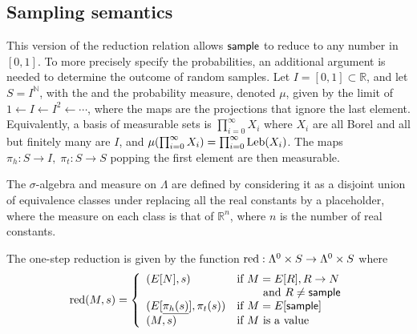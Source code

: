 \subsection{Sampling semantics}
\label{sec:sampling semantics}
This version of the reduction relation allows $\mathsf{sample}$ to reduce to any number in $[0,1]$. To more precisely specify the probabilities, an additional argument is needed to determine the outcome of random samples. Let $ I = [0,1] \subset \mathbb{R} $, and let $S = I^{\mathbb{N}}$, with the  and the probability measure, denoted $\mu$, given by the limit of $1 \gets I \gets I^2 \gets \cdots$, where the maps are the projections that ignore the last element. Equivalently, a basis of measurable sets is $\prod_{i=0}^\infty X_i$ where $X_i$ are all Borel and all but finitely many are $I$, and $\mu (\prod_{i=0}^\infty X_i) = \prod_{i=0}^\infty \mathrm{Leb}(X_i)$.
The maps $\pi_h:S \to I, \; \pi_t:S \to S$ popping the first element are then measurable.

The $\sigma$-algebra and measure on $\Lambda$ are defined by considering it as a disjoint union of equivalence classes under replacing all the real constants by a placeholder, where the measure on each class is that of $\mathbb{R}^n$, where $n$ is the number of real constants.

The one-step reduction is given by the function $\operatorname{red} : \Lambda^0 \times S \to \Lambda^0 \times S$ where
\begin{equation*}
\operatorname{red}(M,s) = \left\{
    \begin{array}{ll}
        (E[N],s) & \text{if } M = E[R], R \to N\\
        & \qquad \text{ and } R \neq \mathsf{sample} \\
        (E[\underline{\pi_h(s)}],\pi_t(s)) & \text{if } M = E[\mathsf{sample}] \\
        (M,s) & \text{if } M \text{ is a value}
    \end{array} \right .
\end{equation*}

